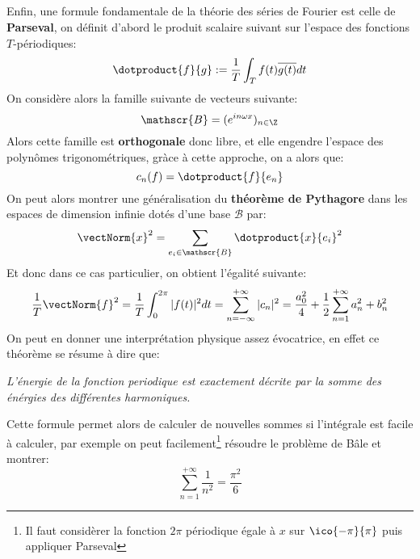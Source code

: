 \subsection*{}
Enfin, une formule fondamentale de la théorie des séries de Fourier est celle de \textbf{Parseval}, on définit d'abord le produit scalaire suivant sur l'espace des fonctions \(T\)-périodiques:
\[
   \dotproduct{f}{g} := \frac{1}{T}\int_T f(t)\overline{g(t)} d t   
\]
On considère alors la famille suivante de vecteurs suivante:
\[
   \mathscr{B} = (e^{in\omega x})_{n \in \Z}
\]
Alors cette famille est \textbf{orthogonale} donc libre, et elle engendre l'espace des polynômes trigonométriques, gràce à cette approche, on a alors que:
\[
   c_n(f) = \dotproduct{f}{e_n}
\]
On peut alors montrer une généralisation du \textbf{théorème de Pythagore} dans les espaces de dimension infinie dotés d'une base \(\mathscr{B}\) par:
\[
   \vectNorm{x}^2 = \sum_{e_i \in \mathscr{B}}\dotproduct{x}{e_i}^2
\]
Et donc dans ce cas particulier, on obtient l'égalité suivante:
\[
   \frac{1}{T} \vectNorm{f}^2 = \frac{1}{T} \int_{0}^{2\pi} |f(t)|^2 d t = \sum_{n=-\infty}^{+\infty} |c_n|^2 = \frac{a_0^2}{4} + \frac{1}{2} \sum_{n=1}^{+\infty} a_n^2 + b_n^2
\]
On peut en donner une interprétation physique assez évocatrice, en effet ce théorème se résume à dire que:
\begin{center}
   \textit{L'énergie de la fonction periodique est exactement décrite par la somme des énérgies des différentes harmoniques.}
\end{center}
Cette formule permet alors de calculer de nouvelles sommes si l'intégrale est facile à calculer, par exemple on peut facilement\footnote[1]{Il faut considèrer la fonction \(2\pi\) périodique égale à \(x\) sur \(\ico{-\pi}{\pi}\) puis appliquer Parseval} résoudre le problème de Bâle et montrer:
\[
   \sum_{n=1}^{+\infty}\frac{1}{n^2} = \frac{\pi^2}{6}   
\]
\pagebreak

